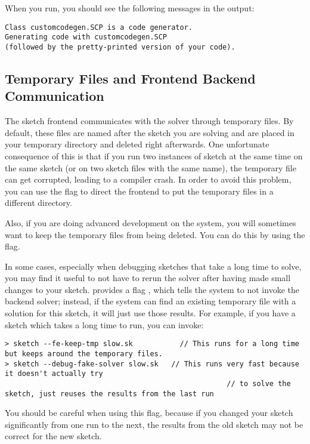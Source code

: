When you run, you should see the following messages in the output:
\begin{lstlisting}
Class customcodegen.SCP is a code generator.
Generating code with customcodegen.SCP
(followed by the pretty-printed version of your code).
\end{lstlisting}



\subsection{Temporary Files and Frontend Backend Communication}

The sketch frontend communicates with the solver through temporary files. 
By default, these files are named after the sketch you are solving and 
are placed in your temporary directory and deleted right afterwards. One 
unfortunate consequence of this is that if you run two instances of sketch at the same 
time on the same sketch (or on two sketch files with the same name), the temporary file
can get corrupted, leading to a compiler crash. In order to avoid this problem, you can use the flag 
 to direct the frontend to put the temporary files in a different directory. 


Also, if you are doing advanced development on the system, you will sometimes want to keep 
the temporary files from being deleted. You can do this by using the  flag.


In some cases, especially when debugging sketches that take a long time to solve, you may find it useful to not have to rerun the solver after having made small changes to your sketch. \Sk{} provides a flag , which tells the system to not invoke the backend solver; instead, if the system can find an existing temporary file with a solution for this sketch, it will just use those results. For example, if you have a sketch  which takes a long time to run, you can invoke:
\begin{lstlisting}
> sketch --fe-keep-tmp slow.sk           // This runs for a long time but keeps around the temporary files.
> sketch --debug-fake-solver slow.sk   // This runs very fast because it doesn't actually try 
                                                    // to solve the sketch, just reuses the results from the last run
\end{lstlisting}
You should be careful when using this flag, because if you changed your sketch significantly from one run to the next, the results from the old sketch may not be correct for the new sketch.

